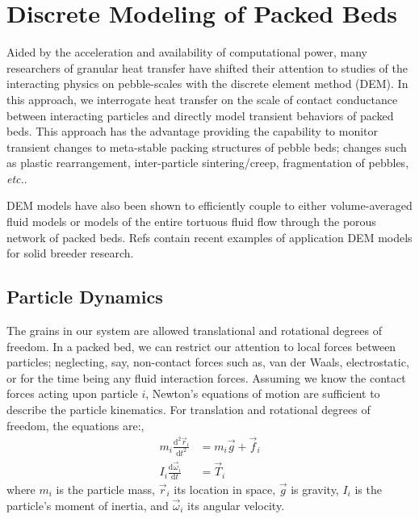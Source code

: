 \documentclass[11pt]{report} %
\newcommand{\dt}[1]{
\frac{\mathrm{d}{#1}}{\mathrm{d}t}}
\newcommand{\ddt}[1]{
\frac{\mathrm{d}^2{#1}}{\mathrm{d}t^2}}
\begin{document}
\section{Discrete Modeling of Packed Beds}
Aided by the acceleration and availability of computational power, many researchers of granular heat transfer have shifted their attention to studies of the interacting physics on pebble-scales with the discrete element method (DEM). In this approach, we interrogate heat transfer on the scale of contact conductance between interacting particles and directly model transient behaviors of packed beds. This approach has the advantage providing the capability to monitor transient changes to meta-stable packing structures of pebble beds; changes such as plastic rearrangement, inter-particle sintering/creep, fragmentation of pebbles, \textit{etc.}.

DEM models have also been shown to efficiently couple to either volume-averaged fluid models or models of the entire tortuous fluid flow through the porous network of packed beds. Refs\cite{Annabattula2011,Lu2000b,An20072233,gan20072233,VanLew2014,VanLew2015} contain recent examples of application DEM models for solid breeder research.



\subsection{Particle Dynamics}\label{sec:particle-dynamics}

The grains in our system are allowed translational and rotational degrees of freedom. In a packed bed, we can restrict our attention to local forces between particles; neglecting, say, non-contact forces such as, van der Waals, electrostatic, or for the time being any fluid interaction forces. Assuming we know the contact forces acting upon particle $i$, Newton's equations of motion are sufficient to describe the particle kinematics. For translation and rotational degrees of freedom, the equations are:,
\begin{subequations}\label{eq:newtons-second}
\begin{align}
	m_i  \ddt{\vec{r}_i}   & = m_i\vec{g} + \vec{f}_i \label{eq:newton-translational} \\
	I_i\dt{\vec{\omega}_i} & = \vec{T}_i \label{eq:newton-rotational}
\end{align}
\end{subequations}
where $m_i$ is the particle mass, $\vec{r}_i$ its location in space, $\vec{g}$ is gravity, $I_i$ is the particle's moment of inertia, and $\vec{\omega}_i$ its angular velocity.
\end{document}

